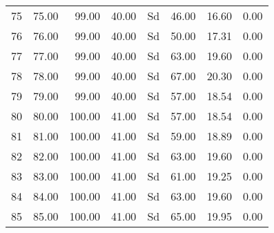 \documentclass{article}
\begin{document}
\begin{table}[ht]
\begin{tabular}{rrrrlrrr}
  75 & 75.00 & 99.00 & 40.00 & Sd & 46.00 & 16.60 & 0.00 \\ 
  76 & 76.00 & 99.00 & 40.00 & Sd & 50.00 & 17.31 & 0.00 \\ 
  77 & 77.00 & 99.00 & 40.00 & Sd & 63.00 & 19.60 & 0.00 \\ 
  78 & 78.00 & 99.00 & 40.00 & Sd & 67.00 & 20.30 & 0.00 \\ 
  79 & 79.00 & 99.00 & 40.00 & Sd & 57.00 & 18.54 & 0.00 \\ 
  80 & 80.00 & 100.00 & 41.00 & Sd & 57.00 & 18.54 & 0.00 \\ 
  81 & 81.00 & 100.00 & 41.00 & Sd & 59.00 & 18.89 & 0.00 \\ 
  82 & 82.00 & 100.00 & 41.00 & Sd & 63.00 & 19.60 & 0.00 \\ 
  83 & 83.00 & 100.00 & 41.00 & Sd & 61.00 & 19.25 & 0.00 \\ 
  84 & 84.00 & 100.00 & 41.00 & Sd & 63.00 & 19.60 & 0.00 \\ 
  85 & 85.00 & 100.00 & 41.00 & Sd & 65.00 & 19.95 & 0.00 \\ 
   \hline
\end{tabular}
\end{table}
\end{document}
